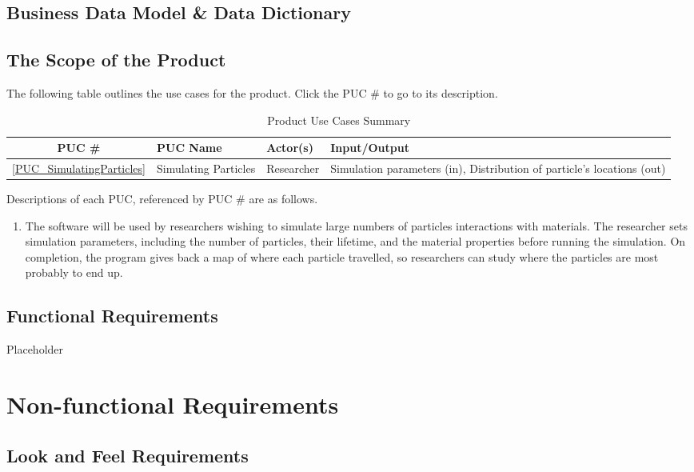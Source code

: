 \documentclass[12pt]{article}
\begin{document}
\subsection{Business Data Model \& Data Dictionary} %


\subsection{The Scope of the Product}
The following table outlines the use cases for the product. Click the PUC \# to go to its description.

\begin{table}[h]
\centering
\begin{tabularx}{\textwidth}{|c|l|l|X|}
\hline
PUC \# & PUC Name & Actor(s) & Input/Output\\
\hline\hline
\ref{PUC_SimulatingParticles} & Simulating Particles & Researcher & Simulation parameters (in), Distribution of particle's locations (out)\\
\hline
\end{tabularx}
\caption{Product Use Cases Summary}
\end{table}

Descriptions of each PUC, referenced by PUC \# are as follows.
\begin{enumerate}
\item \label{PUC_SimulatingParticles} The software will be used by researchers wishing to simulate large numbers of particles interactions with materials. The researcher sets simulation parameters, including the number of particles, their lifetime, and the material properties before running the simulation. On completion, the program gives back a map of where each particle travelled, so researchers can study where the particles are most probably to end up.
\end{enumerate}

\subsection{Functional Requirements} %
Placeholder

\section{Non-functional Requirements}
\subsection{Look and Feel Requirements} %
\end{document}
